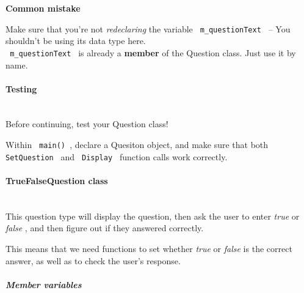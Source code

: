 \documentclass[a4paper,12pt]{book}
\begin{document}
                            
                            \begin{mdframed}[backgroundcolor=error] 
                                \textbf{ Common mistake }

                                Make sure that you're not \textit{ redeclaring }
                                the variable \texttt{ m\_questionText } -- You shouldn't
                                be using its data type here. \\

                                \texttt{ m\_questionText } is already a \textbf{ member }
                                of the Question class. Just use it by name.
                            \end{mdframed}

                            

                    \paragraph{ Testing } ~\\
                        Before continuing, test your Question class!

                        Within \texttt{ main() }, declare a Quesiton object,
                        and make sure that both \texttt{ SetQuestion } and
                        \texttt{ Display } function calls work correctly.

                    \newpage
                    \paragraph{ TrueFalseQuestion class } ~\\
                        This question type will display the question,
                        then ask the user to enter \textit{ true } or
                        \textit{ false }, and then figure out if they
                        answered correctly.

                        This means that we need functions to set whether
                        \textit{ true } or \textit{ false } is the correct
                        answer, as well as to check the user's response.

                        \subparagraph{ Member variables } ~\\
                            
\end{document}
